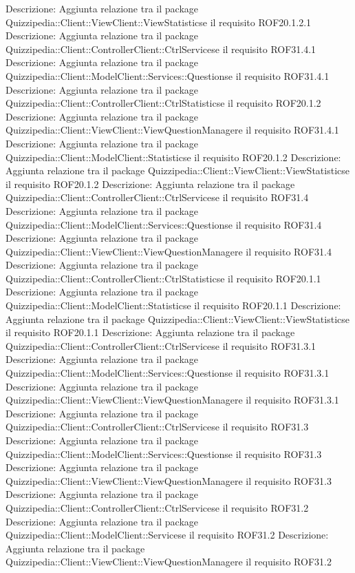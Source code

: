 Descrizione: Aggiunta relazione tra il package Quizzipedia::Client::ViewClient::ViewStatisticse il requisito ROF20.1.2.1 
Descrizione: Aggiunta relazione tra il package Quizzipedia::Client::ControllerClient::CtrlServicese il requisito ROF31.4.1 
Descrizione: Aggiunta relazione tra il package Quizzipedia::Client::ModelClient::Services::Questionse il requisito ROF31.4.1 
Descrizione: Aggiunta relazione tra il package Quizzipedia::Client::ControllerClient::CtrlStatisticse il requisito ROF20.1.2 
Descrizione: Aggiunta relazione tra il package Quizzipedia::Client::ViewClient::ViewQuestionManagere il requisito ROF31.4.1 
Descrizione: Aggiunta relazione tra il package Quizzipedia::Client::ModelClient::Statisticse il requisito ROF20.1.2 
Descrizione: Aggiunta relazione tra il package Quizzipedia::Client::ViewClient::ViewStatisticse il requisito ROF20.1.2 
Descrizione: Aggiunta relazione tra il package Quizzipedia::Client::ControllerClient::CtrlServicese il requisito ROF31.4 
Descrizione: Aggiunta relazione tra il package Quizzipedia::Client::ModelClient::Services::Questionse il requisito ROF31.4 
Descrizione: Aggiunta relazione tra il package Quizzipedia::Client::ViewClient::ViewQuestionManagere il requisito ROF31.4 
Descrizione: Aggiunta relazione tra il package Quizzipedia::Client::ControllerClient::CtrlStatisticse il requisito ROF20.1.1 
Descrizione: Aggiunta relazione tra il package Quizzipedia::Client::ModelClient::Statisticse il requisito ROF20.1.1 
Descrizione: Aggiunta relazione tra il package Quizzipedia::Client::ViewClient::ViewStatisticse il requisito ROF20.1.1 
Descrizione: Aggiunta relazione tra il package Quizzipedia::Client::ControllerClient::CtrlServicese il requisito ROF31.3.1 
Descrizione: Aggiunta relazione tra il package Quizzipedia::Client::ModelClient::Services::Questionse il requisito ROF31.3.1 
Descrizione: Aggiunta relazione tra il package Quizzipedia::Client::ViewClient::ViewQuestionManagere il requisito ROF31.3.1 
Descrizione: Aggiunta relazione tra il package Quizzipedia::Client::ControllerClient::CtrlServicese il requisito ROF31.3 
Descrizione: Aggiunta relazione tra il package Quizzipedia::Client::ModelClient::Services::Questionse il requisito ROF31.3 
Descrizione: Aggiunta relazione tra il package Quizzipedia::Client::ViewClient::ViewQuestionManagere il requisito ROF31.3 
Descrizione: Aggiunta relazione tra il package Quizzipedia::Client::ControllerClient::CtrlServicese il requisito ROF31.2 
Descrizione: Aggiunta relazione tra il package Quizzipedia::Client::ModelClient::Servicese il requisito ROF31.2 
Descrizione: Aggiunta relazione tra il package Quizzipedia::Client::ViewClient::ViewQuestionManagere il requisito ROF31.2 
